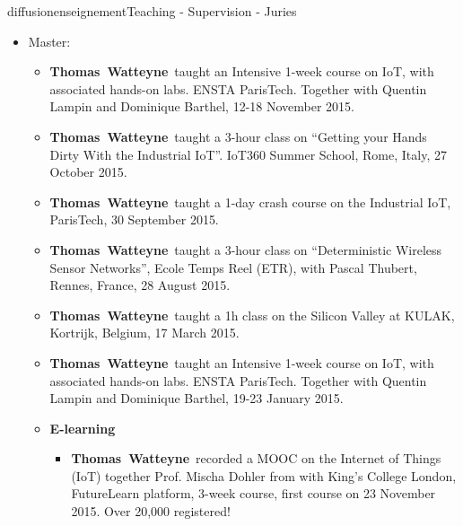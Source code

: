 \documentclass{ra2016}
\newcommand{\pascale}          {\textbf{Pascale~Minet}}
\newcommand{\thomas}           {\textbf{Thomas~Watteyne}}
\begin{document}
\begin{module}{diffusion}{enseignement}{Teaching - Supervision - Juries}
\begin{itemize}
    \item Master:
        \begin{itemize}
            \item \thomas~taught an Intensive 1-week course on IoT, with associated hands-on labs. ENSTA ParisTech. Together with Quentin Lampin and Dominique Barthel, 12-18 November 2015.
            \item \thomas~taught a 3-hour class on ``Getting your Hands Dirty With the Industrial IoT''. IoT360 Summer School, Rome, Italy, 27 October 2015.
            \item \thomas~taught a 1-day crash course on the Industrial IoT, ParisTech, 30 September 2015.
            \item \thomas~taught a 3-hour class on ``Deterministic Wireless Sensor Networks'', Ecole Temps Reel (ETR), with Pascal Thubert, Rennes, France, 28 August 2015.
            \item \thomas~taught a 1h class on the Silicon Valley at KULAK, Kortrijk, Belgium, 17 March 2015.
            \item \thomas~taught an Intensive 1-week course on IoT, with associated hands-on labs. ENSTA ParisTech. Together with Quentin Lampin and Dominique Barthel,  19-23 January 2015.
            \item \textbf{E-learning}  
                \begin{itemize}
                    \item \thomas~recorded a MOOC on the Internet of Things (IoT) together Prof. Mischa Dohler from with King's College London, FutureLearn platform, 3-week course, first course on 23 November 2015. Over 20,000 registered!
                \end{itemize}
        \end{itemize}
\end{itemize}




\end{module}
\end{document}
